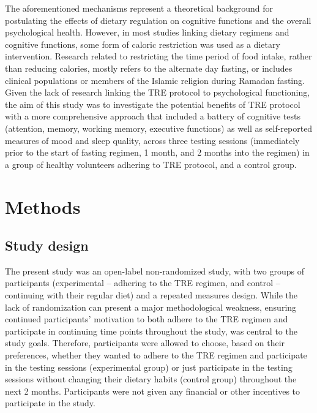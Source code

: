 \documentclass[authordate, empirical,issue]{jote-new-article}
\begin{document}
The aforementioned mechanisms represent a theoretical background for postulating the effects of dietary regulation on cognitive functions and the overall psychological health. However, in most studies linking dietary regimens and cognitive functions, some form of caloric restriction was used as a dietary intervention. Research related to restricting the time period of food intake, rather than reducing calories, mostly refers to the alternate day fasting, or includes clinical populations or members of the Islamic religion during Ramadan fasting. Given the lack of research linking the TRE protocol to psychological functioning, the aim of this study was to investigate the potential benefits of TRE protocol with a more comprehensive approach that included a battery of cognitive tests (attention, memory, working memory, executive functions) as well as self-reported measures of mood and sleep quality, across three testing sessions (immediately prior to the start of fasting regimen, 1 month, and 2 months into the regimen) in a group of healthy volunteers adhering to TRE protocol, and a control group.



\section{Methods}



\subsection{Study design}



The present study was an open-label non-randomized study, with two groups of participants (experimental -- adhering to the TRE regimen, and control -- continuing with their regular diet) and a repeated measures design.\textbf{ }While the lack of randomization can present a major methodological weakness, ensuring continued participants' motivation to both adhere to the TRE regimen and participate in continuing time points throughout the study, was central to the study goals. Therefore, participants were allowed to choose, based on their preferences, whether they wanted to adhere to the TRE regimen and participate in the testing sessions (experimental group) or just participate in the testing sessions without changing their dietary habits (control group) throughout the next 2 months. Participants were not given any financial or other incentives to participate in the study.
\end{document}
